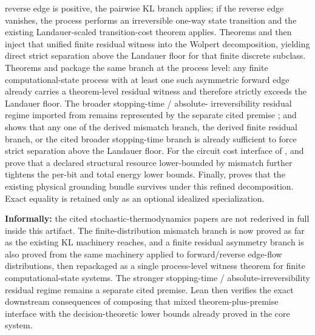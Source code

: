 \begin{theorem}
reverse edge is positive, the pairwise KL branch applies; if the reverse edge
vanishes, the process performs an irreversible one-way state transition and the
existing Landauer-scaled transition-cost theorem applies. Theorems  and
 then inject that unified finite residual witness into the Wolpert
decomposition, yielding direct strict separation above the Landauer floor for
that finite discrete subclass. Theorems  and  package the
same branch at the process level: any finite computational-state process with
at least one such asymmetric forward edge already carries a theorem-level
residual witness and therefore strictly exceeds the Landauer floor. The broader
stopping-time / absolute-
irreversibility residual regime imported from \cite{manzano2024absolute}
remains represented by the separate cited premise ; and  shows
that any one of the derived mismatch branch, the derived finite residual
branch, or the cited broader stopping-time branch is already sufficient to
force strict separation above the Landauer floor. For the circuit cost interface of
\cite{yadav2026minimal},  and  prove that a declared structural
resource lower-bounded by mismatch further tightens the per-bit and total energy
lower bounds. Finally,  proves that the existing physical grounding
bundle survives under this refined decomposition.
Exact equality is retained only as an optional idealized specialization.

\noindent\textbf{Informally:} the cited stochastic-thermodynamics papers are
not rederived in full inside this artifact. The finite-distribution mismatch
branch is now proved as far as the existing KL machinery reaches, and a finite
residual asymmetry branch is also proved from the same machinery applied to
forward/reverse edge-flow distributions, then repackaged as a single
process-level witness theorem for finite computational-state systems. The stronger stopping-time /
absolute-irreversibility residual regime remains a separate cited premise. Lean
then verifies the exact downstream consequences of composing that mixed
theorem-plus-premise interface with the decision-theoretic lower bounds already
proved in the core system.
\end{theorem}

